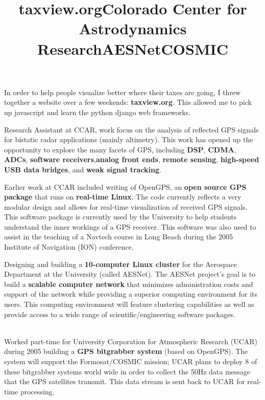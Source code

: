 \begin{resume}
\title{{\bf taxview.org}}
\begin{position}
In order to help people visualize better where their taxes are going, I threw together a website over a few weekends: {\bf taxview.org}. This allowed me to pick up javascript and learn the python django web frameworks.
\end{position}

\title{\bf Colorado Center for Astrodynamics Research}
\begin{position}
Research Assistant at CCAR, work focus on the analysis of reflected GPS signals for bistatic radar applications (mainly altimetry). This work has opened up the opportunity to explore the many facets of GPS, including {\bf DSP}, {\bf CDMA}, {\bf ADCs}, {\bf software receivers},{\bf  analog front ends}, {\bf remote sensing}, {\bf high-speed USB data bridges}, and {\bf weak signal tracking}. 

Earlier work at CCAR included writing of OpenGPS, an {\bf open source GPS package} that runs on {\bf real-time Linux}. The code currently reflects a very modular design and allows for real-time visualization of received GPS signals. This software package is currently used by the University to help students understand the inner workings of a GPS receiver. This software was also used to assist in the teaching of a Navtech course in Long Beach during the 2005 Institute of Navigation (ION) conference. 
\end{position}

\title{\bf AESNet}
\begin{position}
Designing and building a {\bf 10-computer Linux cluster} for the Aerospace Department at the University (called AESNet). The AESNet project's goal is to build a {\bf scalable computer network} that minimizes administration costs and support of the network while providing a superior computing environment for its users. This computing environment will feature clustering capabilities as well as provide access to a wide range of scientific/engineering software packages. \\\\
\end{position}

\title{\bf COSMIC}
\begin{position}
Worked part-time for University Corporation for Atmospheric Research (UCAR) during 2005 building a {\bf GPS bitgrabber system} (based on OpenGPS). The system will support the Formosat/COSMIC mission; UCAR plans to deploy 8 of these bitgrabber systems world wide in order to collect the 50Hz data message that the GPS satellites transmit. This data stream is sent back to UCAR for real-time processing. 
\end{position}


\end{resume}

